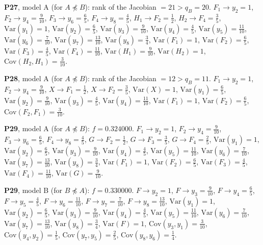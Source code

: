 \documentclass[10pt,a4paper]{article}
\newcommand{\nnest}{\not\preceq}
\begin{document}
{\noindent\textbf{P27}, model A (for $A\nnest B$): rank of the Jacobian $=21>q_B=20$. {\footnotesize $F_{1}\to y_{2}=1$, $F_{2}\to y_{4}=\tfrac{9}{10}$, $F_{3}\to y_{6}=\tfrac{6}{5}$, $F_{4}\to y_{8}=\tfrac{4}{5}$, $H_{1}\to F_{2}=\tfrac{1}{2}$, $H_{2}\to F_{4}=\tfrac{3}{5}$, $\mathrm{Var}(y_{1})=1$, $\mathrm{Var}(y_{2})=\tfrac{6}{5}$, $\mathrm{Var}(y_{3})=\tfrac{9}{10}$, $\mathrm{Var}(y_{4})=\tfrac{4}{5}$, $\mathrm{Var}(y_{5})=\tfrac{11}{10}$, $\mathrm{Var}(y_{6})=\tfrac{7}{10}$, $\mathrm{Var}(y_{7})=\tfrac{13}{10}$, $\mathrm{Var}(y_{8})=\tfrac{3}{4}$, $\mathrm{Var}(F_{1})=1$, $\mathrm{Var}(F_{2})=\tfrac{6}{5}$, $\mathrm{Var}(F_{3})=\tfrac{4}{5}$, $\mathrm{Var}(F_{4})=\tfrac{11}{10}$, $\mathrm{Var}(H_{1})=\tfrac{9}{10}$, $\mathrm{Var}(H_{2})=1$, $\mathrm{Cov}(H_{2},H_{1})=\tfrac{3}{10}$.}\par\smallskip
\noindent\textbf{P28}, model A (for $A\nnest B$): rank of the Jacobian $=12>q_B=11$. {\footnotesize $F_{1}\to y_{2}=1$, $F_{2}\to y_{4}=\tfrac{9}{10}$, $X\to F_{1}=\tfrac{1}{2}$, $X\to F_{2}=\tfrac{3}{5}$, $\mathrm{Var}(X)=1$, $\mathrm{Var}(y_{1})=\tfrac{6}{5}$, $\mathrm{Var}(y_{2})=\tfrac{9}{10}$, $\mathrm{Var}(y_{3})=\tfrac{4}{5}$, $\mathrm{Var}(y_{4})=\tfrac{11}{10}$, $\mathrm{Var}(F_{1})=1$, $\mathrm{Var}(F_{2})=\tfrac{6}{5}$, $\mathrm{Cov}(F_{2},F_{1})=\tfrac{3}{10}$.}\par\smallskip
\noindent\textbf{P29}, model A (for $A\nnest B$): $f=0.324000$. {\footnotesize $F_{1}\to y_{2}=1$, $F_{2}\to y_{4}=\tfrac{9}{10}$, $F_{3}\to y_{6}=\tfrac{6}{5}$, $F_{4}\to y_{8}=\tfrac{4}{5}$, $G\to F_{2}=\tfrac{1}{2}$, $G\to F_{3}=\tfrac{3}{5}$, $G\to F_{4}=\tfrac{2}{5}$, $\mathrm{Var}(y_{1})=1$, $\mathrm{Var}(y_{2})=\tfrac{6}{5}$, $\mathrm{Var}(y_{3})=\tfrac{9}{10}$, $\mathrm{Var}(y_{4})=\tfrac{4}{5}$, $\mathrm{Var}(y_{5})=\tfrac{11}{10}$, $\mathrm{Var}(y_{6})=\tfrac{7}{10}$, $\mathrm{Var}(y_{7})=\tfrac{13}{10}$, $\mathrm{Var}(y_{8})=\tfrac{3}{4}$, $\mathrm{Var}(F_{1})=1$, $\mathrm{Var}(F_{2})=\tfrac{6}{5}$, $\mathrm{Var}(F_{3})=\tfrac{4}{5}$, $\mathrm{Var}(F_{4})=\tfrac{11}{10}$, $\mathrm{Var}(G)=\tfrac{9}{10}$.}\par\smallskip
\noindent\textbf{P29}, model B (for $B\nnest A$): $f=0.330000$. {\footnotesize $F\to y_{2}=1$, $F\to y_{3}=\tfrac{9}{10}$, $F\to y_{4}=\tfrac{6}{5}$, $F\to y_{5}=\tfrac{4}{5}$, $F\to y_{6}=\tfrac{11}{10}$, $F\to y_{7}=\tfrac{7}{10}$, $F\to y_{8}=\tfrac{13}{10}$, $\mathrm{Var}(y_{1})=1$, $\mathrm{Var}(y_{2})=\tfrac{6}{5}$, $\mathrm{Var}(y_{3})=\tfrac{9}{10}$, $\mathrm{Var}(y_{4})=\tfrac{4}{5}$, $\mathrm{Var}(y_{5})=\tfrac{11}{10}$, $\mathrm{Var}(y_{6})=\tfrac{7}{10}$, $\mathrm{Var}(y_{7})=\tfrac{13}{10}$, $\mathrm{Var}(y_{8})=\tfrac{3}{4}$, $\mathrm{Var}(F)=1$, $\mathrm{Cov}(y_{3},y_{1})=\tfrac{3}{10}$, $\mathrm{Cov}(y_{4},y_{2})=\tfrac{1}{5}$, $\mathrm{Cov}(y_{7},y_{5})=\tfrac{2}{5}$, $\mathrm{Cov}(y_{8},y_{6})=\tfrac{1}{4}$.}\par\smallskip
}
\end{document}
